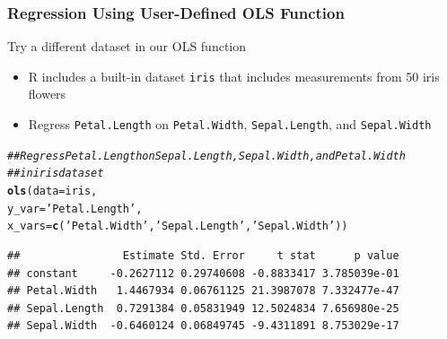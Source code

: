 \documentclass{beamer}\usepackage[]{graphicx}\usepackage[]{xcolor}
\makeatletter
\newcommand{\hlstr}[1]{\textcolor[rgb]{0.192,0.494,0.8}{#1}}%
\newcommand{\hlcom}[1]{\textcolor[rgb]{0.678,0.584,0.686}{\textit{#1}}}%
\newcommand{\hlstd}[1]{\textcolor[rgb]{0.345,0.345,0.345}{#1}}%
\newcommand{\hlkwc}[1]{\textcolor[rgb]{0.333,0.667,0.333}{#1}}%
\newcommand{\hlkwd}[1]{\textcolor[rgb]{0.737,0.353,0.396}{\textbf{#1}}}%
\newenvironment{kframe}{%
 \def\at@end@of@kframe{}%
 \ifinner\ifhmode%
  \def\at@end@of@kframe{\end{minipage}}%
  \begin{minipage}{\columnwidth}%
 \fi\fi%
 \def\FrameCommand##1{\hskip\@totalleftmargin \hskip-\fboxsep
 \colorbox{shadecolor}{##1}\hskip-\fboxsep
     \hskip-\linewidth \hskip-\@totalleftmargin \hskip\columnwidth}%
 \MakeFramed {\advance\hsize-\width
   \@totalleftmargin\z@ \linewidth\hsize
   \@setminipage}}%
 {\par\unskip\endMakeFramed%
 \at@end@of@kframe}
\newenvironment{knitrout}{}{} %
\makeatother
\begin{document}
\begin{frame}[fragile]\frametitle{Regression Using User-Defined OLS Function}
    Try a different dataset in our OLS function
    \begin{itemize}
        \item R includes a built-in dataset \texttt{iris} that includes measurements from 50 iris flowers
        \item Regress \texttt{Petal.Length} on \texttt{Petal.Width}, \texttt{Sepal.Length}, and \texttt{Sepal.Width}
    \end{itemize}
\begin{knitrout}\footnotesize
{}\color{fgcolor}\begin{kframe}
\begin{alltt}
\hlcom{## Regress Petal.Length on Sepal.Length, Sepal.Width, and Petal.Width }
\hlcom{## in iris dataset}
\hlkwd{ols}\hlstd{(}\hlkwc{data} \hlstd{= iris,}
    \hlkwc{y_var} \hlstd{=} \hlstr{'Petal.Length'}\hlstd{,}
    \hlkwc{x_vars} \hlstd{=} \hlkwd{c}\hlstd{(}\hlstr{'Petal.Width'}\hlstd{,} \hlstr{'Sepal.Length'}\hlstd{,} \hlstr{'Sepal.Width'}\hlstd{))}
\end{alltt}
\begin{verbatim}
##                Estimate Std. Error     t stat      p value
## constant     -0.2627112 0.29740608 -0.8833417 3.785039e-01
## Petal.Width   1.4467934 0.06761125 21.3987078 7.332477e-47
## Sepal.Length  0.7291384 0.05831949 12.5024834 7.656980e-25
## Sepal.Width  -0.6460124 0.06849745 -9.4311891 8.753029e-17
\end{verbatim}
\end{kframe}
\end{knitrout}
\end{frame}
\end{document}
